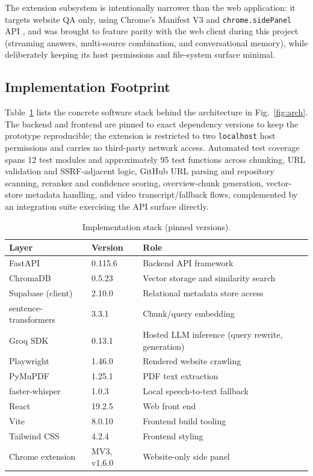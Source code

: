 \documentclass[conference]{IEEEtran}
\begin{document}
The extension subsystem is intentionally narrower than the web
application: it targets website QA only, using Chrome's Manifest V3 and
\texttt{chrome.sidePanel} API \cite{chromesidepanel2026,mv32026}, and
was brought to feature parity with the web client during this project
(streaming answers, multi-source combination, and conversational
memory), while deliberately keeping its host permissions and file-system
surface minimal.

\subsection{Implementation Footprint}
Table~\ref{tab:stack} lists the concrete software stack behind the
architecture in Fig.~\ref{fig:arch}. The backend and frontend are pinned
to exact dependency versions to keep the prototype reproducible; the
extension is restricted to two \texttt{localhost} host permissions and
carries no third-party network access. Automated test coverage spans 12
test modules and approximately 95 test functions across chunking, URL
validation and SSRF-adjacent logic, GitHub URL parsing and repository
scanning, reranker and confidence scoring, overview-chunk generation,
vector-store metadata handling, and video transcript/fallback flows,
complemented by an integration suite exercising the API surface directly.

\begin{table}[t]
\caption{Implementation stack (pinned versions).}
\label{tab:stack}
\centering
\begin{tabular}{p{1.6cm}p{1.1cm}p{3.3cm}}
\hline
\textbf{Layer} & \textbf{Version} & \textbf{Role} \\
\hline
FastAPI & 0.115.6 & Backend API framework \\
ChromaDB & 0.5.23 & Vector storage and similarity search \\
Supabase (client) & 2.10.0 & Relational metadata store access \\
sentence-transformers & 3.3.1 & Chunk/query embedding \\
Groq SDK & 0.13.1 & Hosted LLM inference (query rewrite, generation) \\
Playwright & 1.46.0 & Rendered website crawling \\
PyMuPDF & 1.25.1 & PDF text extraction \\
faster-whisper & 1.0.3 & Local speech-to-text fallback \\
React & 19.2.5 & Web front end \\
Vite & 8.0.10 & Frontend build tooling \\
Tailwind CSS & 4.2.4 & Frontend styling \\
Chrome extension & MV3, v1.6.0 & Website-only side panel \\
\hline
\end{tabular}
\end{table}
\end{document}
